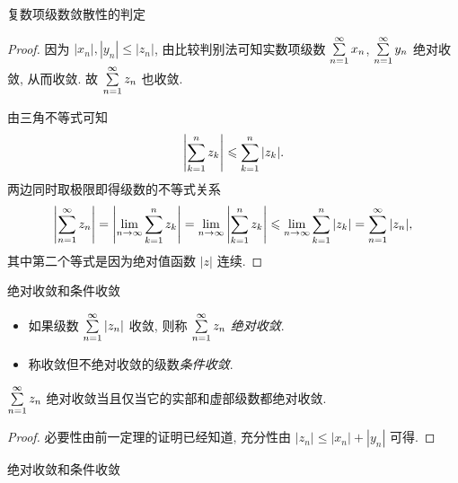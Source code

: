\begin{frame}{复数项级数敛散性的判定}
\beqskip{7pt}
\begin{proof}
\indent
因为 $|x_n|,|y_n|\le|z_n|$, 由比较判别法可知实数项级数 $\sum\limits_{n=1}^\infty x_n$, $\sum\limits_{n=1}^\infty y_n$ 绝对收敛, 从而收敛.
\onslide<+->
故 $\sum\limits_{n=1}^\infty z_n$ 也收敛.

\onslide<+->
\indent
由三角不等式可知
\[\left|\sum_{k=1}^n z_k\right|\leqslant \sum_{k=1}^n|z_k|.\]
\onslide<+->
两边同时取极限即得级数的不等式关系
\[\left|\sum_{n=1}^\infty z_n\right|=\left|\lim_{n\to\infty}\sum_{k=1}^n z_k\right|=
\lim_{n\to\infty}\left|\sum_{k=1}^n z_k\right|\leqslant\lim_{n\to\infty}\sum_{k=1}^n|z_k|=\sum_{n=1}^\infty |z_n|,\]
\onslide<+->
其中第二个等式是因为绝对值函数 $|z|$ 连续.
\end{proof}
\endgroup
\end{frame}


\begin{frame}{绝对收敛和条件收敛}
\begin{definition}
\begin{itemize}
\item 如果级数 $\sum\limits_{n=1}^\infty |z_n|$ 收敛, 则称 $\sum\limits_{n=1}^\infty z_n$ \emph{绝对收敛}.
\item 称收敛但不绝对收敛的级数\emph{条件收敛}.
\end{itemize}
\end{definition}
\begin{theorem}
$\sum\limits_{n=1}^\infty z_n$ 绝对收敛当且仅当它的实部和虚部级数都绝对收敛.
\end{theorem}
\begin{proof}
必要性由前一定理的证明已经知道,
\onslide<+->
充分性由 $|z_n|\le|x_n|+|y_n|$ 可得.
\end{proof}
\end{frame}


\begin{frame}{绝对收敛和条件收敛}
\begin{center}
\renewcommand\arraystretch{2}
{}
\end{center}
\end{frame}


